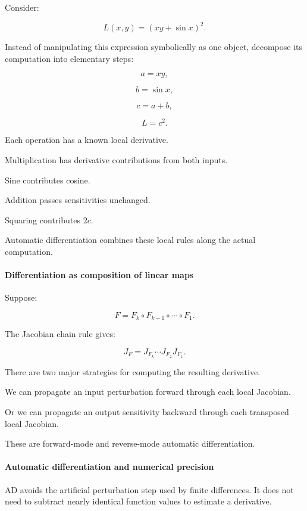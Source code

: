 Consider:

\[
L(x,y)=\left(xy+\sin x\right)^2.
\]

Instead of manipulating this expression symbolically as one object, decompose its computation into elementary steps:

\[
a=xy,
\]

\[
b=\sin x,
\]

\[
c=a+b,
\]

\[
L=c^2.
\]

Each operation has a known local derivative.

Multiplication has derivative contributions from both inputs.

Sine contributes cosine.

Addition passes sensitivities unchanged.

Squaring contributes \(2c\).

Automatic differentiation combines these local rules along the actual computation.

\paragraph{Differentiation as composition of linear maps}\label{02-foundations-ii-ch022-differentiation-as-composition-of-linear-maps}

Suppose:

\[
F=F_k\circ F_{k-1}\circ\cdots\circ F_1.
\]

The Jacobian chain rule gives:

\[
J_F = J_{F_k}\cdots J_{F_2}J_{F_1}.
\]

There are two major strategies for computing the resulting derivative.

We can propagate an input perturbation forward through each local Jacobian.

Or we can propagate an output sensitivity backward through each transposed local Jacobian.

These are forward-mode and reverse-mode automatic differentiation.

\paragraph{Automatic differentiation and numerical precision}\label{02-foundations-ii-ch022-automatic-differentiation-and-numerical-precision}

AD avoids the artificial perturbation step used by finite differences. It does not need to subtract nearly identical function values to estimate a derivative.

